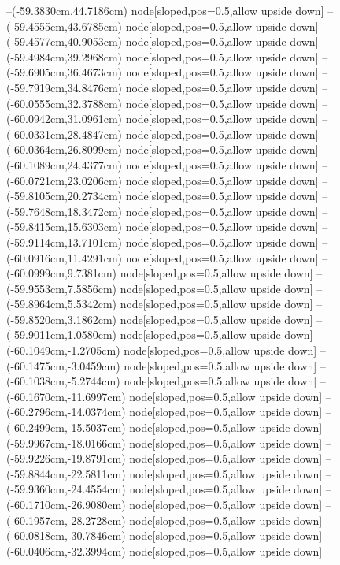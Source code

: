 --(-59.3830cm,44.7186cm) node[sloped,pos=0.5,allow upside down]{\ArrowIn}
--(-59.4555cm,43.6785cm) node[sloped,pos=0.5,allow upside down]{\ArrowIn}
--(-59.4577cm,40.9053cm) node[sloped,pos=0.5,allow upside down]{\ArrowIn}
--(-59.4984cm,39.2968cm) node[sloped,pos=0.5,allow upside down]{\ArrowIn}
--(-59.6905cm,36.4673cm) node[sloped,pos=0.5,allow upside down]{\ArrowIn}
--(-59.7919cm,34.8476cm) node[sloped,pos=0.5,allow upside down]{\ArrowIn}
--(-60.0555cm,32.3788cm) node[sloped,pos=0.5,allow upside down]{\ArrowIn}
--(-60.0942cm,31.0961cm) node[sloped,pos=0.5,allow upside down]{\ArrowIn}
--(-60.0331cm,28.4847cm) node[sloped,pos=0.5,allow upside down]{\ArrowIn}
--(-60.0364cm,26.8099cm) node[sloped,pos=0.5,allow upside down]{\ArrowIn}
--(-60.1089cm,24.4377cm) node[sloped,pos=0.5,allow upside down]{\ArrowIn}
--(-60.0721cm,23.0206cm) node[sloped,pos=0.5,allow upside down]{\ArrowIn}
--(-59.8105cm,20.2734cm) node[sloped,pos=0.5,allow upside down]{\ArrowIn}
--(-59.7648cm,18.3472cm) node[sloped,pos=0.5,allow upside down]{\ArrowIn}
--(-59.8415cm,15.6303cm) node[sloped,pos=0.5,allow upside down]{\ArrowIn}
--(-59.9114cm,13.7101cm) node[sloped,pos=0.5,allow upside down]{\ArrowIn}
--(-60.0916cm,11.4291cm) node[sloped,pos=0.5,allow upside down]{\ArrowIn}
--(-60.0999cm,9.7381cm) node[sloped,pos=0.5,allow upside down]{\ArrowIn}
--(-59.9553cm,7.5856cm) node[sloped,pos=0.5,allow upside down]{\ArrowIn}
--(-59.8964cm,5.5342cm) node[sloped,pos=0.5,allow upside down]{\ArrowIn}
--(-59.8520cm,3.1862cm) node[sloped,pos=0.5,allow upside down]{\ArrowIn}
--(-59.9011cm,1.0580cm) node[sloped,pos=0.5,allow upside down]{\ArrowIn}
--(-60.1049cm,-1.2705cm) node[sloped,pos=0.5,allow upside down]{\ArrowIn}
--(-60.1475cm,-3.0459cm) node[sloped,pos=0.5,allow upside down]{\ArrowIn}
--(-60.1038cm,-5.2744cm) node[sloped,pos=0.5,allow upside down]{\ArrowIn}
--(-60.1670cm,-11.6997cm) node[sloped,pos=0.5,allow upside down]{\ArrowIn}
--(-60.2796cm,-14.0374cm) node[sloped,pos=0.5,allow upside down]{\ArrowIn}
--(-60.2499cm,-15.5037cm) node[sloped,pos=0.5,allow upside down]{\ArrowIn}
--(-59.9967cm,-18.0166cm) node[sloped,pos=0.5,allow upside down]{\ArrowIn}
--(-59.9226cm,-19.8791cm) node[sloped,pos=0.5,allow upside down]{\ArrowIn}
--(-59.8844cm,-22.5811cm) node[sloped,pos=0.5,allow upside down]{\ArrowIn}
--(-59.9360cm,-24.4554cm) node[sloped,pos=0.5,allow upside down]{\ArrowIn}
--(-60.1710cm,-26.9080cm) node[sloped,pos=0.5,allow upside down]{\ArrowIn}
--(-60.1957cm,-28.2728cm) node[sloped,pos=0.5,allow upside down]{\ArrowIn}
--(-60.0818cm,-30.7846cm) node[sloped,pos=0.5,allow upside down]{\ArrowIn}
--(-60.0406cm,-32.3994cm) node[sloped,pos=0.5,allow upside down]{\ArrowIn}
